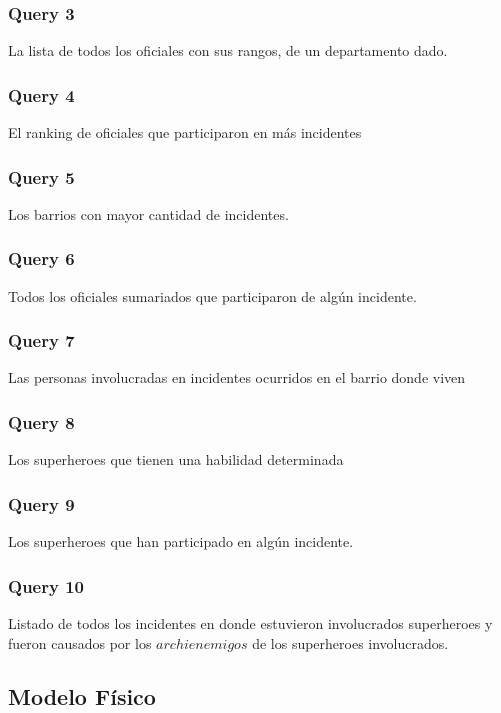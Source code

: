 \subsubsection{Query 3}
La lista de todos los oficiales con sus rangos, de un departamento dado.



\subsubsection{Query 4}
El ranking de oficiales que participaron en más incidentes



\subsubsection{Query 5}
Los barrios con mayor cantidad de incidentes.



\subsubsection{Query 6}
Todos los oficiales sumariados que participaron de algún incidente.



\subsubsection{Query 7}
Las personas involucradas en incidentes ocurridos en el barrio donde viven



\subsubsection{Query 8}
Los superheroes que tienen una habilidad determinada



\subsubsection{Query 9}
Los superheroes que han participado en algún incidente.



\subsubsection{Query 10}
Listado de todos los incidentes en donde estuvieron involucrados superheroes
y fueron causados por los $archienemigos$ de los superheroes involucrados.



\newpage
\subsection{Modelo Físico}

